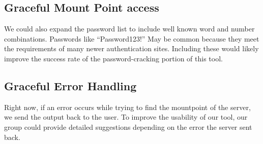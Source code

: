 \documentclass[a4paper]{article}
\begin{document}
\subsection{Graceful Mount Point access}
We could also expand the password list to include well known word and number combinations. Passwords like “Password123!” May be common because they meet the requirements of many newer authentication sites. Including these would likely improve the success rate of the password-cracking portion of this tool. 

\subsection{Graceful Error Handling}
Right now, if an error occurs while trying to find the mountpoint of the server, we send the output back to the user. To improve the usability of our tool, our group could provide detailed suggestions depending on the error the server sent back.
\end{document}
